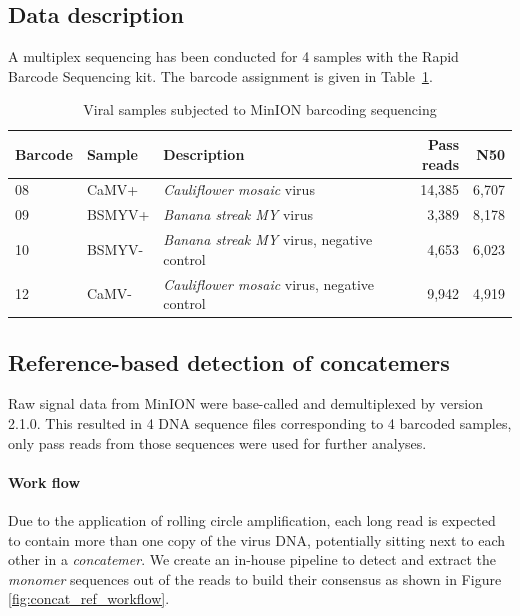 \subsection{Data description}
A multiplex sequencing has been conducted for 4 samples with the Rapid Barcode Sequencing kit. The barcode assignment is given in Table~\ref{tab:viral_samples}.
\begin{table}[!hpt]
\centering
\caption{Viral samples subjected to MinION barcoding sequencing}
\label{tab:viral_samples}
\begin{tabular}{|l|l|l|r|r|}
\hline
\textbf{Barcode} & \textbf{Sample} & \textbf{Description} & \textbf{Pass reads}  & \textbf{N50}    \\\hline
08                  & CaMV+              & \emph{Cauliflower mosaic} virus  &   14,385   &      6,707 \\\hline
09                  & BSMYV+             & \emph{Banana streak MY} virus    &   3,389   &   8,178   \\\hline        
10                  & BSMYV-             & \emph{Banana streak MY} virus, negative control     &   4,653   &  6,023   \\\hline
12                  & CaMV-              & \emph{Cauliflower mosaic} virus, negative control     &   9,942   &  4,919   \\\hline
\end{tabular}
\end{table}

\subsection{Reference-based detection of concatemers}
Raw signal data from MinION were base-called and demultiplexed by \albacore{} version 2.1.0. This resulted in 4 DNA sequence files corresponding to 4 barcoded samples, only pass reads from those sequences were used for further analyses.

\paragraph{Work flow} Due to the application of rolling circle amplification, each long read is expected to contain more than one copy of the virus DNA, potentially sitting next to each other in a \emph{concatemer}. We create an in-house pipeline to detect and extract the \emph{monomer} sequences out of the reads to build their consensus as shown in Figure \ref{fig:concat_ref_workflow}.

